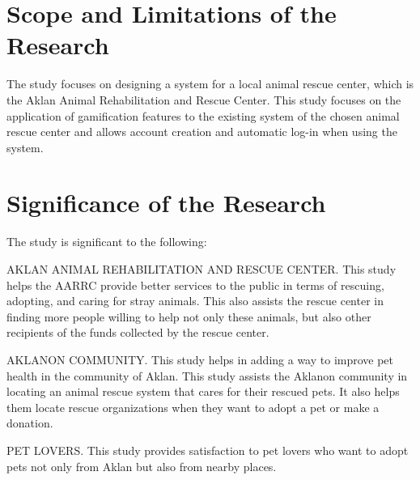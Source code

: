 \section{Scope and Limitations of the Research}
\label{sec:scopelimitations}

The study focuses on designing a system for a local animal rescue center, which
is the Aklan Animal Rehabilitation and Rescue Center. This study focuses on the
application of gamification features to the existing system of the chosen animal
rescue center and allows account creation and automatic log-in when using the
system.

\begin{comment}

%
%
Generally, one paragraph should be allotted for each of your research objectives.

Each paragraph contains a brief overview of the concept/theory and the purpose of doing the associated objective.

Each paragraph also includes a description of the scope/limitation of your study.

* Please refer to the slides for examples.

\end{comment}


\section{Significance of the Research}
\label{sec:significance}

The study is significant to the following:

AKLAN ANIMAL REHABILITATION AND RESCUE CENTER. This study helps the AARRC provide better services to the public in terms of rescuing,
adopting, and caring for stray animals. This also assists the rescue center in
finding more people willing to help not only these animals, but also other recipients
of the funds collected by the rescue center.

AKLANON COMMUNITY. This study helps in adding a way to improve
pet health in the community of Aklan. This study  assists the Aklanon community
in locating an animal rescue system that cares for their rescued pets.
It also helps them locate rescue organizations when they want to adopt a pet
or make a donation.

PET LOVERS. This study provides satisfaction to pet lovers who want to
adopt pets not only from Aklan but also from nearby places.

